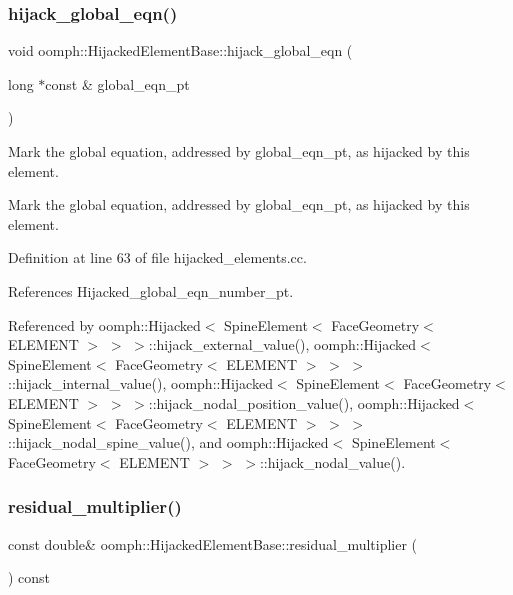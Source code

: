 \subsubsection{\texorpdfstring{hijack\+\_\+global\+\_\+eqn()}{hijack\_global\_eqn()}}
{\footnotesize\ttfamily void oomph\+::\+Hijacked\+Element\+Base\+::hijack\+\_\+global\+\_\+eqn (\begin{DoxyParamCaption}\item[{long $\ast$const \&}]{global\+\_\+eqn\+\_\+pt }\end{DoxyParamCaption})\hspace{0.3cm}{\ttfamily [protected]}}



Mark the global equation, addressed by global\+\_\+eqn\+\_\+pt, as hijacked by this element. 

Mark the global equation, addressed by global\+\_\+eqn\+\_\+pt, as hijacked by this element. 

Definition at line 63 of file hijacked\+\_\+elements.\+cc.



References Hijacked\+\_\+global\+\_\+eqn\+\_\+number\+\_\+pt.



Referenced by oomph\+::\+Hijacked$<$ Spine\+Element$<$ Face\+Geometry$<$ E\+L\+E\+M\+E\+N\+T $>$ $>$ $>$\+::hijack\+\_\+external\+\_\+value(), oomph\+::\+Hijacked$<$ Spine\+Element$<$ Face\+Geometry$<$ E\+L\+E\+M\+E\+N\+T $>$ $>$ $>$\+::hijack\+\_\+internal\+\_\+value(), oomph\+::\+Hijacked$<$ Spine\+Element$<$ Face\+Geometry$<$ E\+L\+E\+M\+E\+N\+T $>$ $>$ $>$\+::hijack\+\_\+nodal\+\_\+position\+\_\+value(), oomph\+::\+Hijacked$<$ Spine\+Element$<$ Face\+Geometry$<$ E\+L\+E\+M\+E\+N\+T $>$ $>$ $>$\+::hijack\+\_\+nodal\+\_\+spine\+\_\+value(), and oomph\+::\+Hijacked$<$ Spine\+Element$<$ Face\+Geometry$<$ E\+L\+E\+M\+E\+N\+T $>$ $>$ $>$\+::hijack\+\_\+nodal\+\_\+value().

\mbox{\label{classoomph_1_1HijackedElementBase_a79740641b6ac5b5a966d072bd10ab66a}} 
\subsubsection{\texorpdfstring{residual\+\_\+multiplier()}{residual\_multiplier()}}
{\footnotesize\ttfamily const double\& oomph\+::\+Hijacked\+Element\+Base\+::residual\+\_\+multiplier (\begin{DoxyParamCaption}{ }\end{DoxyParamCaption}) const\hspace{0.3cm}{\ttfamily [inline]}}



